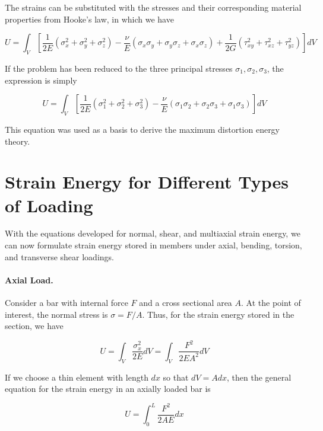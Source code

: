 \documentclass[
10pt,
a4paper,
openany,
svgnames,
]{kaobook} %
\begin{document}
The strains can be substituted with the stresses and their corresponding material properties from Hooke's law, in which we have

\begin{equation}
  U = \int_V \left[ \frac{1}{2E} \left( \sigma_x^2 + \sigma_y^2 + \sigma_z^2 \right) - \frac{\nu}{E} \left( \sigma_x \sigma_y + \sigma_y \sigma_z + \sigma_x \sigma_z \right) + \frac{1}{2G} \left( \tau_{xy}^2 + \tau_{xz}^2 + \tau_{yz}^2 \right) \right] dV
\end{equation}

If the problem has been reduced to the three principal stresses $\sigma_1, \sigma_2, \sigma_3$, the expression is simply

\begin{equation}
  U = \int_V \left[ \frac{1}{2E} \left( \sigma_1^2 + \sigma_2^2 + \sigma_3^2 \right) - \frac{\nu}{E} \left( \sigma_1 \sigma_2 + \sigma_2 \sigma_3 + \sigma_1 \sigma_3 \right) \right] dV
\end{equation}

This equation was used as a basis to derive the maximum distortion energy theory.

\section{Strain Energy for Different Types of Loading}

With the equations developed for normal, shear, and multiaxial strain energy, we can now formulate strain energy stored in members under axial, bending, torsion, and transverse shear loadings.

\paragraph{Axial Load.}

Consider a bar with internal force $F$ and a cross sectional area $A$. At the point of interest, the normal stress is $\sigma = F / A$. Thus, for the strain energy stored in the section, we have

\begin{equation*}
  U = \int_V \frac{\sigma_x^2}{2E} dV = \int_V \frac{F^2}{2EA^2}dV
\end{equation*}

If we choose a thin element with length $dx$ so that $dV = A dx$, then the general equation for the strain energy in an axially loaded bar is

\begin{equation}
  U = \int_0^L \frac{F^2}{2AE} dx
\end{equation}
\end{document}
